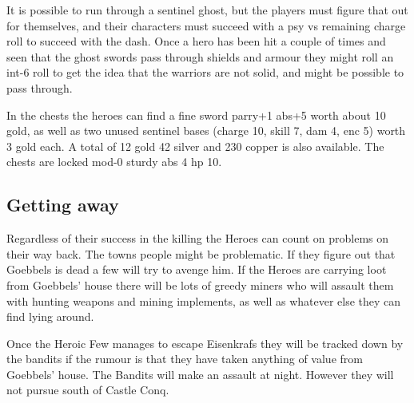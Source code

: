\documentclass[11pt, twoside, titlepage, a4paper]{report}
\begin{document}
It is possible to run through a sentinel ghost, but the players must figure that out for themselves, and their characters must succeed with a psy vs remaining charge roll to succeed with the dash. Once a hero has been hit a couple of times and seen that the ghost swords pass through shields and armour they might roll an int-6 roll to get the idea that the warriors are not solid, and might be possible to pass through.

In the chests the heroes can find a fine sword parry+1 abs+5 worth about 10 gold, as well as two unused sentinel bases (charge 10, skill 7, dam 4, enc 5) worth 3 gold each. A total of 12 gold 42 silver and 230 copper is also available. The chests are locked mod-0 sturdy abs 4 hp 10.


\subsection*{Getting away}
Regardless of their success in the killing the Heroes can count on problems on their way back. The towns people might be problematic. If they figure out that Goebbels is dead a few will try to avenge him. If the Heroes are carrying loot from Goebbels' house there will be lots of greedy miners who will assault them with hunting weapons and mining implements, as well as whatever else they can find lying around.

Once the Heroic Few manages to escape Eisenkrafs they will be tracked down by the bandits if the rumour is that they have taken anything of value from Goebbels' house. The Bandits will make an assault at night. However they will not pursue south of Castle Conq.
\end{document}
